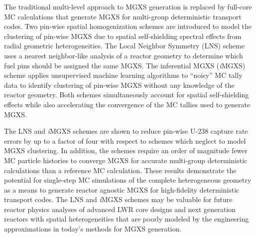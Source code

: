 \begin{abstractpage}

The traditional multi-level approach to MGXS generation is replaced by full-core MC calculations that generate MGXS for multi-group deterministic transport codes. Two pin-wise spatial homogenization schemes are introduced to model the clustering of pin-wise MGXS due to spatial self-shielding spectral effects from radial geometric heterogeneities. The Local Neighbor Symmetry (LNS) scheme uses a nearest neighbor-like analysis of a reactor geometry to determine which fuel pins should be assigned the same MGXS. The inferential MGXS (\textit{i}MGXS) scheme applies unsupervised machine learning algorithms to ``noisy'' MC tally data to identify clustering of pin-wise MGXS without any knowledge of the reactor geometry. Both schemes simultaneously account for spatial self-shielding effects while also accelerating the convergence of the MC tallies used to generate MGXS.




The LNS and \textit{i}MGXS schemes are shown to reduce pin-wise U-238 capture rate errors by up to a factor of four with respect to schemes which neglect to model MGXS clustering. In addition, the schemes require an order of magnitude fewer MC particle histories to converge MGXS for accurate multi-group deterministic calculations than a reference MC calculation. These results demonstrate the potential for single-step MC simulations of the complete heterogeneous geometry as a means to generate reactor agnostic MGXS for high-fidelity deterministic transport codes. The LNS and \textit{i}MGXS schemes may be valuable for future reactor physics analyses of advanced LWR core designs and next generation reactors with spatial heterogeneities that are poorly modeled by the engineering approximations in today's methods for MGXS generation.


\end{abstractpage}
